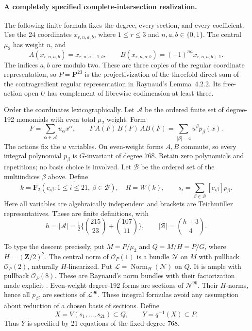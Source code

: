 \paragraph{A completely specified complete-intersection realization.}
The following finite formula fixes the degree, every section, and every
coefficient. Use the 24 coordinates $x_{r,n,a,b}$, where $1\leq r\leq3$
and $n,a,b\in\{0,1\}$. The central $\mu_2$ has weight $n$, and
\[
 A(x_{r,n,a,b})=x_{r,n,a+1,b},\qquad
 B(x_{r,n,a,b})=(-1)^{na}x_{r,n,a,b+1}.                    \tag{E4.H.4}
\]
The indices $a,b$ are modulo two. These are three copies of the regular
coordinate representation, so $P=\mathbf P^{23}$ is the projectivization
of the threefold direct sum of the contragredient regular representation
in Raynaud's Lemma~4.2.2. Its free-action open $U$ has complement of
fibrewise codimension at least three.

Order the coordinates lexicographically. Let $\mathcal A$ be the ordered
finite set of degree-192 monomials with even total $\mu_2$ weight. Form
\[
 F=\sum_{\alpha\in\mathcal A}u_\alpha x^\alpha,
 \qquad F\,A(F)\,B(F)\,AB(F)=\sum_{|\beta|=4}u^\beta p_\beta(x).
                                                               \tag{E4.H.5}
\]
The actions fix the $u$ variables. On even-weight forms $A,B$ commute,
so every integral polynomial $p_\beta$ is $G$-invariant of degree 768.
Retain zero polynomials and repetitions; no basis choice is involved.
Let $\mathcal B$ be the ordered set of the multiindices $\beta$ above.
Define
\[
 k=\overline{\mathbf F_2(c_{i\beta}:1\leq i\leq21,
                                  \ \beta\in\mathcal B)},
 \quad R=W(k),\qquad
 s_i=\sum_{\beta\in\mathcal B}[c_{i\beta}]p_\beta.          \tag{E4.H.6}
\]
Here all variables are algebraically independent and brackets are
Teichm\"uller representatives. These are finite definitions, with
\[
 h=|\mathcal A|=\tfrac12\{\binom{215}{23}+\binom{107}{11}\},
 \qquad |\mathcal B|=\binom{h+3}{4}.
\]

To type the descent precisely, put $M=P/\mu_2$ and $Q=M/H=P/G$, where
$H=(\mathbf Z/2)^2$. The central norm of $\mathcal O_P(1)$ is a bundle
$\mathcal N$ on $M$ with pullback $\mathcal O_P(2)$, naturally
$H$-linearized. Put $\mathcal L=\operatorname{Norm}_H(\mathcal N)$ on
$Q$. It is ample with pullback $\mathcal O_P(8)$. These are Raynaud's
norm bundles with their factorization made explicit
\cite[proof of Proposition~4.2.3, p.~137]{BCERaynaud1979}.
Even-weight degree-192 forms are sections of $\mathcal N^{96}$.
Their $H$-norms, hence all $p_\beta$, are sections of $\mathcal L^{96}$.
These integral formulas avoid any assumption about reduction of a chosen
basis of sections. Define
\[
 X=V(s_1,\ldots,s_{21})\subset Q,
 \qquad Y=q^{-1}(X)\subset P.                              \tag{E4.H.7}
\]
Thus $Y$ is specified by 21 equations of the fixed degree 768.

